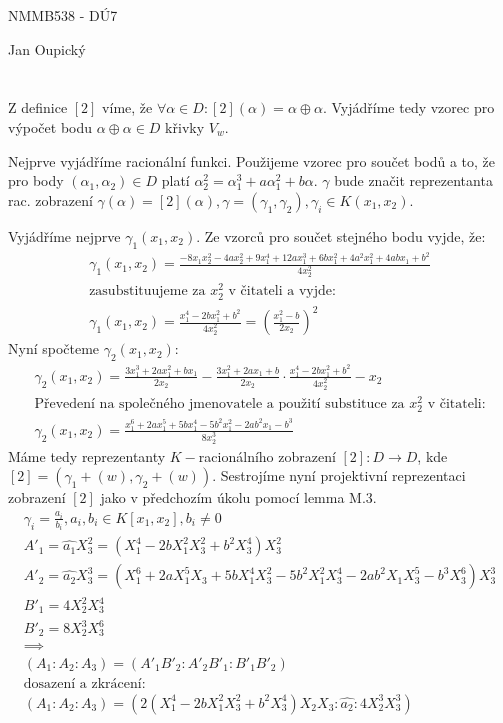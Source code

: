 \documentclass[12pt, a4paper]{article}
\begin{document}
\begin{center}
\large NMMB538 - DÚ7

\normalsize Jan Oupický
\end{center}
\vspace{1\baselineskip}

\section{}
Z definice $[2]$ víme, že $\forall \alpha \in D: [2](\alpha) = \alpha \oplus \alpha$. Vyjádříme tedy vzorec pro výpočet bodu $\alpha \oplus \alpha \in D$ křivky $V_w$.

Nejprve vyjádříme racionální funkci. Použijeme vzorec pro součet bodů a to, že pro body $(\alpha_1, \alpha_2) \in D$ platí $\alpha_2^2 = \alpha_1^3+a \alpha_1^2 + b \alpha$. $\gamma$ bude značit reprezentanta rac. zobrazení $\gamma(\alpha) = [2](\alpha), \gamma = (\gamma_1, \gamma_2), \gamma_i \in K(x_1, x_2)$. 

Vyjádříme nejprve $\gamma_1(x_1,x_2)$. Ze vzorců pro součet stejného bodu vyjde, že:
\begin{gather*}
\gamma_1(x_1,x_2) = \frac{-8x_1x_2^2 - 4ax_2^2 + 9x_1^4+12ax_1^3+6bx_1^2+4a^2x_1^2+4abx_1+b^2}{4x_2^2}\\
\text{zasubstituujeme za $x_2^2$ v čitateli a vyjde:}\\
\gamma_1(x_1,x_2) = \frac{x_1^4-2bx_1^2+b^2}{4x_2^2} = \left( \frac{x_1^2-b}{2x_2} \right)^2
\end{gather*}
Nyní spočteme $\gamma_2(x_1,x_2)$:
\begin{gather*}
\gamma_2(x_1,x_2) = \frac{3x_1^3+2ax_1^2+bx_1}{2x_2}-\frac{3x_1^2+2ax_1+b}{2x_2}\cdot \frac{x_1^4-2bx_1^2+b^2}{4x_2^2}-x_2\\
\text{Převedení na společného jmenovatele a použití substituce za $x_2^2$ v čitateli:}\\
\gamma_2(x_1,x_2) = \frac{x_1^6+2ax_1^5+5bx_1^4-5b^2x_1^2-2ab^2x_1-b^3}{8x_2^3}
\end{gather*}
Máme tedy reprezentanty $K-$racionálního zobrazení $[2]: D \rightarrow D$, kde \\$[2] = (\gamma_1+(w), \gamma_2+(w))$. Sestrojíme nyní projektivní reprezentaci zobrazení $[2]$ jako v předchozím úkolu pomocí lemma M.3.
\begin{gather*}
\gamma_i = \frac{a_i}{b_i}, a_i, b_i \in K[x_1,x_2], b_i \neq 0\\
A'_1 = \widehat{a_1} X_3^2 = (X_1^4-2bX_1^2X_3^2 + b^2X_3^4)X_3^2\\
A'_2 = \widehat{a_2} X_3^3 = (X_1^6+2aX_1^5X_3+5bX_1^4X_3^2-5b^2X_1^2X_3^4-2ab^2X_1X_3^5-b^3X_3^6) X_3^3\\
B'_1 = 4X_2^2X_3^4\\
B'_2 = 8X_2^3X_3^6\\
\implies\\
(A_1 : A_2 : A_3) = (A'_1B'_2 : A'_2B'_1 : B'_1B'_2)\\
\text{dosazení a zkrácení:}\\
(A_1 : A_2 : A_3) = (2(X_1^4-2bX_1^2X_3^2 + b^2X_3^4)X_2X_3 : \widehat{a_2} : 4X_2^3X_3^3)
\end{gather*}
\end{document}
